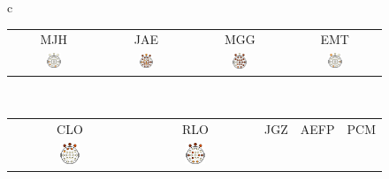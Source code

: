 \begin{figure}
\centering
\begin{tabular}{c}
\begin{tabular}{cccc}
MJH & JAE & MGG & EMT \\
\includegraphics[width=0.17\textwidth]{./img_art_dfa/prop_MJH_30.pdf} &
\includegraphics[width=0.17\textwidth]{./img_art_dfa/prop_JAE_30.pdf} &
\includegraphics[width=0.17\textwidth]{./img_art_dfa/prop_MGG_30.pdf} &
\includegraphics[width=0.17\textwidth]{./img_art_dfa/prop_EMT_30.pdf} \\
\end{tabular} \\
\midrule
\begin{tabular}{ccccc}
CLO & RLO & JGZ & AEFP & PCM \\
\includegraphics[width=0.17\textwidth]{./img_art_dfa/prop_CLO_30.pdf} &
\includegraphics[width=0.17\textwidth]{./img_art_dfa/prop_RLO_30.pdf} &

\end{tabular}
\end{tabular}
\end{figure}
